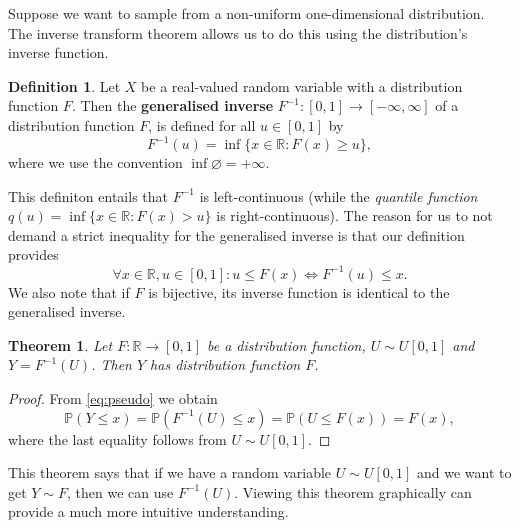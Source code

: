 \documentclass[
]{book}
\newtheorem{theorem}{Theorem}[chapter]
\theoremstyle{definition}
\newtheorem{definition}{Definition}[chapter]
\theoremstyle{definition}
\theoremstyle{definition}
\theoremstyle{definition}
\theoremstyle{remark}
\begin{document}
Suppose we want to sample from a non-uniform one-dimensional distribution. The inverse transform theorem allows us to do this using the distribution's inverse function.

\begin{definition}
Let \(X\) be a real-valued random variable with a distribution function \(F\). Then the \textbf{generalised inverse} \(F^{-1}\colon [0,1] \to [-\infty,\infty]\) of a distribution function \(F\), is defined for all \(u \in [0, 1]\) by
\[
F^{-1}(u) = \inf\{x \in\mathbb{R} : F(x) \geq u\},
\]
where we use the convention \(\inf \varnothing = +\infty\).
\end{definition}

This definiton entails that $F^{-1}$ is left-continuous (while the \textit{quantile function} \(q(u) = \inf\{x \in \mathbb{R}: F(x) > u\}\) is right-continuous). The reason for us to not demand a strict inequality for the generalised inverse is that our definition provides
\begin{equation}\label{eq:pseudo}
\forall x \in \mathbb{R}, u \in [0,1]: u \leq F(x) \iff F^{-1}(u) \leq x. 
\end{equation}
We also note that if \(F\) is bijective, its inverse function is identical to the generalised inverse.

\begin{theorem}
Let \(F :\mathbb{R} \rightarrow [0, 1]\) be a  distribution function, \(U \sim U[0, 1]\) and \(Y = F^{-1}(U)\). Then \(Y\) has distribution function \(F\).
\end{theorem}

\begin{proof}
From \eqref{eq:pseudo} we obtain
\[
\mathbb{P}(Y \leq x) = \mathbb{P}(F^{-1}(U) \leq x) = \mathbb{P}(U \leq F(x)) = F(x),
\]
where the last equality follows from \(U \sim U[0, 1]\).
\end{proof}

This theorem says that if we have a random variable \(U \sim U[0, 1]\) and we want to get \(Y \sim F\), then we can use \(F^{-1}(U)\). Viewing this theorem graphically can provide a much more intuitive understanding.
\end{document}
